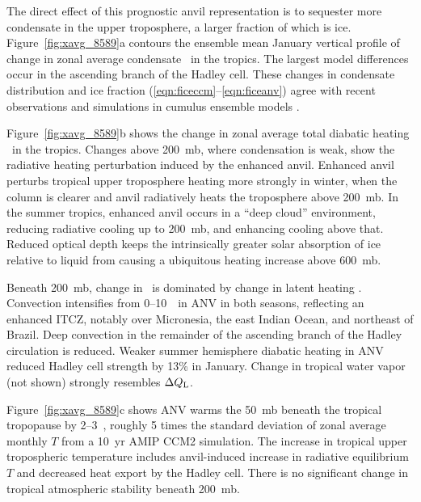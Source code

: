 \documentclass[twocolumn,twoside,final,10pt]{article}
\begin{document}
The direct effect of this prognostic anvil representation is to
sequester more condensate in the upper troposphere, a larger fraction
of which is ice.
Figure~\ref{fig:xavg_8589}a contours the ensemble mean January
vertical profile of change in zonal average condensate \qc\ in 
the tropics.  
The largest model differences occur in the ascending branch of
the Hadley cell.
These changes in condensate distribution and ice fraction
(\ref{eqn:ficeccm}--\ref{eqn:ficeanv}) agree with 
recent observations \cite[]{WSS931,GrM96} and simulations in cumulus 
ensemble models \cite[]{SLT94,GMK95}. 

Figure~\ref{fig:xavg_8589}b shows the change in zonal average total
diabatic heating \QT\ in the tropics.
Changes above 200~mb, where condensation is weak, show the radiative
heating perturbation induced by the enhanced anvil.
Enhanced anvil perturbs tropical upper troposphere heating more
strongly in winter, when the column is clearer and anvil radiatively
heats the troposphere above 200~mb.  
In the summer tropics, enhanced anvil occurs in a ``deep cloud''
environment, reducing radiative cooling up to 200~mb, and enhancing
cooling above that. 
Reduced optical depth keeps the intrinsically greater solar absorption
of ice relative to liquid from causing a ubiquitous heating increase
above 600~mb.

Beneath 200~mb, change in \QT\ is dominated by change in latent
heating \QL. 
Convection intensifies from 0--10~\dgrn\ in ANV in both seasons,
reflecting an enhanced ITCZ, notably over Micronesia, the east
Indian Ocean, and northeast of Brazil. 
Deep convection in the remainder of the ascending branch of the Hadley
circulation is reduced. 
Weaker summer hemisphere diabatic heating in ANV reduced Hadley cell
strength by 13\% in January.
Change in tropical water vapor (not shown) strongly resembles $\Delta
\mbox{$Q_\mathrm{L}$}$.

Figure~\ref{fig:xavg_8589}c shows ANV warms the 50~mb beneath the
tropical tropopause by 2--3~\dgrk, roughly 5 times the standard
deviation of  zonal average monthly $T$ from a 10~yr AMIP CCM2
simulation. 
The increase in tropical upper tropospheric temperature includes
anvil-induced increase in radiative equilibrium $T$ and decreased heat
export by the Hadley cell.
There is no significant change in tropical atmospheric stability
beneath 200~mb. 
\end{document}
